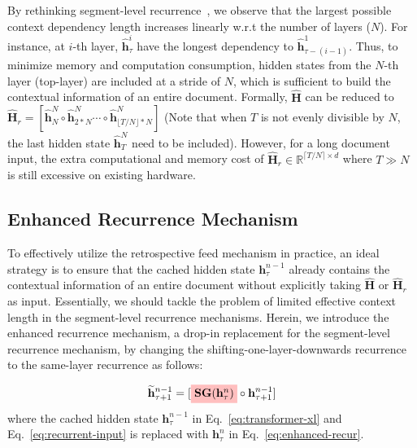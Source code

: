 \documentclass[11pt,a4paper]{article}
\begin{document}
By rethinking segment-level recurrence~\citep{transformer_xl}, we observe that the largest possible context dependency length increases linearly w.r.t the number of layers ($N$). For instance, at $i$-th layer, $\mathbf{\widehat{h}}_{\tau}^{i}$ have the longest dependency to $\mathbf{\widehat{h}}_{\tau-(i-1)}^{1}$. Thus, to minimize memory and computation consumption, hidden states from the $N$-th layer (top-layer) are included at a stride of $N$, which is sufficient to build the contextual information of an entire document. Formally, $\mathbf{\widehat{H}}$ can be reduced to $\mathbf{\widehat{H}}_r = [\mathbf{\widehat{h}}_{N}^{N} \circ \mathbf{\widehat{h}}_{2*N}^{N} \cdots \circ \mathbf{\widehat{h}}_{\lfloor T/N \rfloor*N}^{N}]$ (Note that when $T$ is not evenly divisible by $N$, the last hidden state  $\mathbf{\widehat{h}}_{T}^{N}$ need to be included). However, for a long document input, the extra computational and memory cost of $\mathbf{\widehat{H}}_r \in \mathbb{R}^{\lceil T / N \rceil \times d}$ where $T \gg N$ is still excessive on existing hardware.





\subsection{Enhanced Recurrence Mechanism}\label{sec:lift-mem}
To effectively utilize the retrospective feed mechanism in practice, an ideal strategy is to ensure that the cached hidden state $\mathbf{h}_\tau^{n-1}$ already contains the contextual information of an entire document without explicitly taking $\mathbf{\widehat{H}}$ or $\mathbf{\widehat{H}}_r$ as input. Essentially, we should tackle the problem of limited effective context length in the segment-level recurrence mechanisms. Herein, we introduce the enhanced recurrence mechanism, a drop-in replacement for the segment-level recurrence mechanism, by changing the shifting-one-layer-downwards recurrence to the same-layer recurrence as follows: 

\begin{equation}
   \widetilde{\mathbf{h}}_{\tau+1}^{n-1} = [\colorbox{pink}{\textbf{SG}($\mathbf{h}_{\tau}^{n}$)} \circ \mathbf{h}_{\tau+1}^{n-1}]
\label{eq:enhanced-recur}
\end{equation}
where the cached hidden state $\mathbf{h}_{\tau}^{n-1}$ in Eq.~\ref{eq:transformer-xl} and Eq.~\ref{eq:recurrent-input} is replaced with $\mathbf{h}_{\tau}^{n}$ in Eq.~\ref{eq:enhanced-recur}. 
\end{document}
